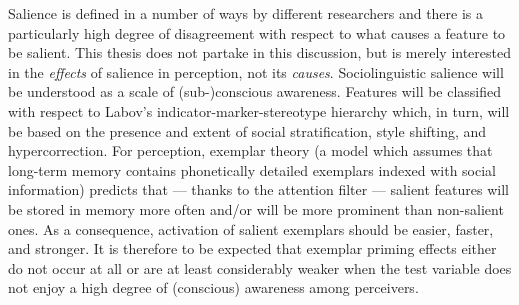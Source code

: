 Salience is defined in a number of ways by different researchers and there is a particularly high degree of disagreement with respect to what causes a feature to be salient.
This thesis does not partake in this discussion, but is merely interested in the \emph{effects} of salience in perception, not its \emph{causes}.
Sociolinguistic salience will be understood as a scale of (sub-)conscious awareness.
Features will be classified with respect to Labov's indicator-marker-stereotype hierarchy which, in turn, will be based on the presence and extent of social stratification, style shifting, and hypercorrection.
For perception, exemplar theory (a model which assumes that long-term memory contains phonetically detailed exemplars indexed with social information) predicts that --- thanks to the attention filter --- salient features will be stored in memory more often and/or will be more prominent than non-salient ones.
As a consequence, activation of salient exemplars should be easier, faster, and stronger.
It is therefore to be expected that exemplar priming effects either do not occur at all or are at least considerably weaker when the test variable does not enjoy a high degree of (conscious) awareness among perceivers.